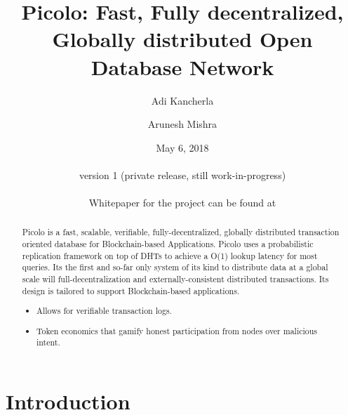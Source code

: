 \documentclass[a4paper]{article}
\begin{document}
\pagecolor{oldlace}

\title{Picolo: Fast, Fully decentralized, Globally distributed Open Database Network}
\author{Adi Kancherla \and Arunesh Mishra}
\date{May 6, 2018 \\\hfill \\version 1 (private release, still work-in-progress) \\\hfill \\Whitepaper for the project can be found at \cite{Picolo_Whitepaper}}
\maketitle
\begin{abstract}

    Picolo is a fast, scalable, verifiable, fully-decentralized, globally distributed transaction oriented database for Blockchain-based Applications. Picolo uses a probabilistic replication framework on top of DHTs to achieve a O(1) lookup latency for most queries. Its the first and so-far only system of its kind to distribute data at a global scale will full-decentralization and externally-consistent distributed transactions. Its design is tailored to support Blockchain-based applications.

    \begin{itemize}
        \item Allows for verifiable transaction logs.
        \item Token economics that gamify honest participation from nodes over malicious intent.
    \end{itemize}

\end{abstract}


\section{Introduction}\label{Sect:Introduction}
\end{document}
